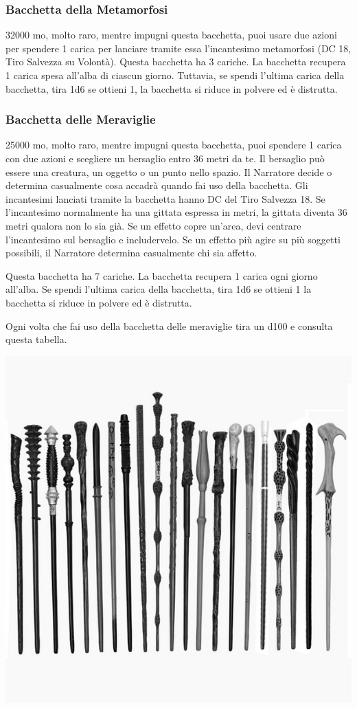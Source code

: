 \begin{multicols}{2}
\subsubsection*{Bacchetta della Metamorfosi}
32000 mo, molto raro, mentre impugni questa bacchetta, puoi usare due azioni per spendere 1 carica per lanciare tramite essa l'incantesimo metamorfosi (DC 18, Tiro Salvezza su Volontà). Questa bacchetta ha 3 cariche. La bacchetta recupera 1 carica spesa all'alba di ciascun giorno. Tuttavia, se spendi l'ultima carica della bacchetta, tira 1d6 se ottieni 1, la bacchetta si riduce in polvere ed è distrutta.

\subsubsection*{Bacchetta delle Meraviglie}
25000 mo, molto raro, mentre impugni questa bacchetta, puoi spendere 1 carica con due azioni e scegliere un bersaglio entro 36 metri da te. Il bersaglio può essere una creatura, un oggetto o un punto nello spazio. Il Narratore decide o determina casualmente cosa accadrà quando fai uso della bacchetta. Gli incantesimi lanciati tramite la bacchetta hanno DC del Tiro Salvezza 18. Se l'incantesimo normalmente ha una gittata espressa in metri, la gittata diventa 36 metri qualora non lo sia già. Se un effetto copre un'area, devi centrare l'incantesimo sul bersaglio e includervelo. Se un effetto più agire su più soggetti possibili, il Narratore determina casualmente chi sia affetto.

Questa bacchetta ha 7 cariche. La bacchetta recupera 1 carica ogni giorno all'alba. Se spendi l'ultima carica della bacchetta, tira 1d6 se ottieni 1 la bacchetta si riduce in polvere ed è distrutta.

Ogni volta che fai uso della bacchetta delle meraviglie tira un d100 e consulta questa tabella.

\end{multicols}

\begin{center}
\includegraphics[width=0.3\linewidth]{immagini/bacchette.png}

\end{center}

